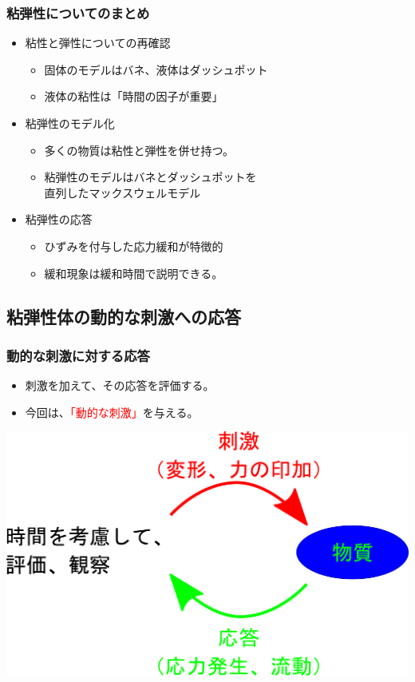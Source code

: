 \documentclass[12pt, dvipdfmx]{beamer}
\begin{document}
\begin{frame}
	\frametitle{粘弾性についてのまとめ}
        \begin{boxnote}
            \vspace{-3mm}
            \begin{itemize}
                \item 粘性と弾性についての再確認
                    \begin{itemize}
                        \item 固体のモデルはバネ、液体はダッシュポット
                        \item 液体の粘性は「時間の因子が重要」
                    \end{itemize} 
                \item 粘弾性のモデル化
                    \begin{itemize}
                        \item 多くの物質は粘性と弾性を併せ持つ。
                        \item 粘弾性のモデルはバネとダッシュポットを\\直列したマックスウェルモデル
                    \end{itemize} 
                \item 粘弾性の応答
                    \begin{itemize}
                        \item ひずみを付与した応力緩和が特徴的
                        \item 緩和現象は緩和時間で説明できる。
                    \end{itemize}
            \end{itemize}
        \end{boxnote}
\end{frame}

\subsection{粘弾性体の動的な刺激への応答}
\begin{frame}
	\frametitle{動的な刺激に対する応答}
	\begin{itemize}
		\item 刺激を加えて、その応答を評価する。
		\item 今回は、\textcolor{red}{「動的な刺激」}を与える。
	\end{itemize}

	\vspace{5mm}
			\centering
				\includegraphics[width=.75\textwidth]{Rheo_method.png}
\end{frame}
\end{document}
